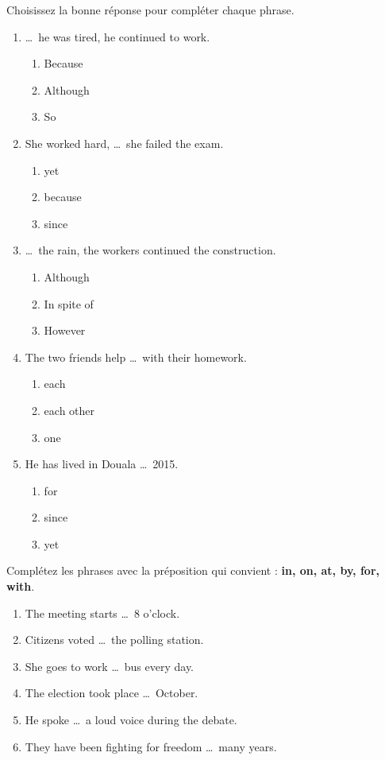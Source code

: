 \documentclass[11pt]{article}
\begin{document}
\begin{exercice}
Choisissez la bonne réponse pour compléter chaque phrase.
\begin{enumerate}
  \item \ldots\ he was tired, he continued to work.
  \begin{enumerate}
    \item Because \quad \item Although \quad \item So
  \end{enumerate}
  \item She worked hard, \ldots\ she failed the exam.
  \begin{enumerate}
    \item yet \quad \item because \quad \item since
  \end{enumerate}
  \item \ldots\ the rain, the workers continued the construction.
  \begin{enumerate}
    \item Although \quad \item In spite of \quad \item However
  \end{enumerate}
  \item The two friends help \ldots\ with their homework.
  \begin{enumerate}
    \item each \quad \item each other \quad \item one
  \end{enumerate}
  \item He has lived in Douala \ldots\ 2015.
  \begin{enumerate}
    \item for \quad \item since \quad \item yet
  \end{enumerate}
\end{enumerate}
\end{exercice}

\begin{exercice}
Complétez les phrases avec la préposition qui convient : \textbf{in, on, at, by, for, with}.
\begin{enumerate}
  \item The meeting starts \ldots\ 8 o'clock.
  \item Citizens voted \ldots\ the polling station.
  \item She goes to work \ldots\ bus every day.
  \item The election took place \ldots\ October.
  \item He spoke \ldots\ a loud voice during the debate.
  \item They have been fighting for freedom \ldots\ many years.
\end{enumerate}
\end{exercice}
\end{document}

